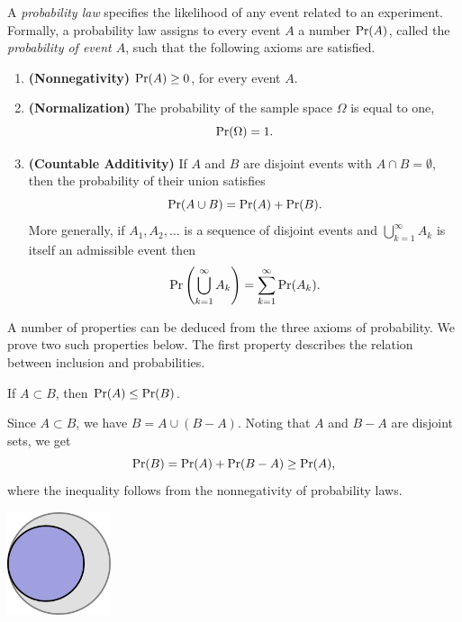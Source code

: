 A \emph{probability law} specifies the likelihood of any event related to an experiment.
Formally, a probability law assigns to every event $A$ a number $\Pr (A)$, called the \emph{probability of event $A$}, such that the following axioms are satisfied.
\begin{enumerate}
\item \textbf{(Nonnegativity)} $\Pr (A) \geq 0$, for every event $A$.
\item \textbf{(Normalization)} The probability of the sample space $\Omega$ is equal to one,
\begin{equation*}
\Pr (\Omega) = 1 .
\end{equation*}
\item \textbf{(Countable Additivity)} If $A$ and $B$ are disjoint events with $A \cap B = \emptyset$, then the probability of their union satisfies
\begin{equation*}
\Pr (A \cup B) = \Pr (A) + \Pr(B) .
\end{equation*}
More generally, if $A_1, A_2, \ldots$ is a sequence of disjoint events and $\bigcup_{k=1}^{\infty} A_k$ is itself an admissible event then
\begin{equation*}
\Pr \left( \bigcup_{k=1}^{\infty} A_k \right)
= \sum_{k = 1}^{\infty} \Pr (A_k) .
\end{equation*}
\end{enumerate}

A number of properties can be deduced from the three axioms of probability.
We prove two such properties below.
The first property describes the relation between inclusion and probabilities.
\begin{proposition}
If $A \subset B$, then $\Pr (A) \leq \Pr (B)$.
\end{proposition}
Since $A \subset B$, we have $B = A \cup (B - A)$.
Noting that $A$ and $B - A$ are disjoint sets, we get
\begin{equation*}
\Pr (B) = \Pr (A) + \Pr (B - A) \geq \Pr (A) ,
\end{equation*}
where the inequality follows from the nonnegativity of probability laws.

\begin{center}
\includegraphics[height=3.03cm]{Figures/2Chapter/subset}
\end{center}

